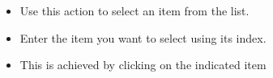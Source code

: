 \begin{itemize}
\item Use this action to select an item from the list. 
\item Enter the item you want to select using its index.
\item This is achieved by clicking on the indicated item
\end{itemize}

